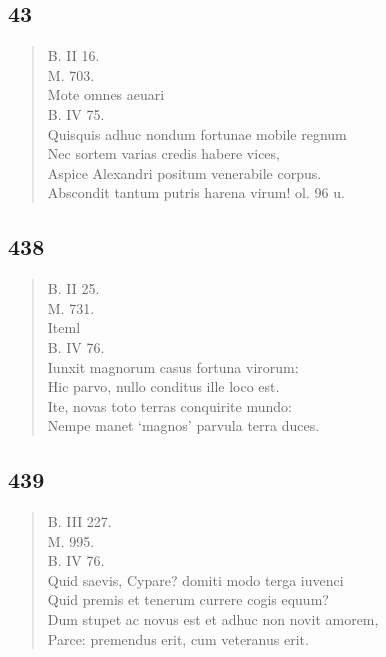 \documentclass[11pt, a4paper]{report}
\begin{document}
            \subsection*{43}
      \begin{verse}
      B. II 16. \\ M. 703. \\ Mote omnes aeuari \\ B. IV 75. \\ Quisquis adhuc nondum fortunae mobile regnum \\ Nec sortem varias credis habere vices, \\ Aspice Alexandri positum venerabile corpus. \\ Abscondit tantum putris harena virum! ol. 96 u. \\ 
      \end{verse}
  
            \subsection*{438}
      \begin{verse}
      B. II 25. \\ M. 731. \\ Iteml \\ B. IV 76. \\ Iunxit magnorum casus fortuna virorum: \\ Hic parvo, nullo conditus ille loco est. \\ Ite, novas toto terras conquirite mundo: \\ Nempe manet ‘magnos’ parvula terra duces. \\ 
      \end{verse}
  
            \subsection*{439}
      \begin{verse}
      B. III 227. \\ M. 995. \\ B. IV 76. \\ Quid saevis, Cypare? domiti modo terga iuvenci \\ Quid premis et tenerum currere cogis equum? \\ Dum stupet ac novus est et adhuc non novit amorem, \\ Parce: premendus erit, cum veteranus erit. \\ 
      \end{verse}
  
\end{document}
